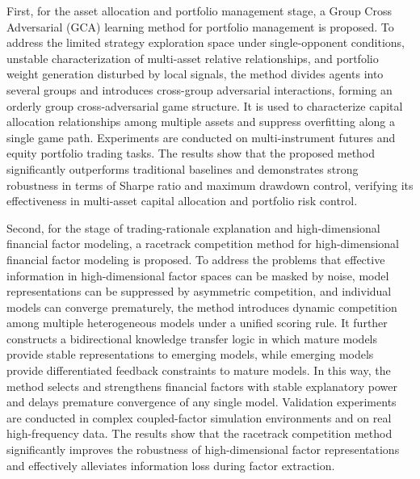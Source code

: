 \begin{eabstract}
First, for the asset allocation and portfolio management stage, a Group Cross Adversarial (GCA) learning method for portfolio management is proposed. To address the limited strategy exploration space under single-opponent conditions, unstable characterization of multi-asset relative relationships, and portfolio weight generation disturbed by local signals, the method divides agents into several groups and introduces cross-group adversarial interactions, forming an orderly group cross-adversarial game structure. It is used to characterize capital allocation relationships among multiple assets and suppress overfitting along a single game path. Experiments are conducted on multi-instrument futures and equity portfolio trading tasks. The results show that the proposed method significantly outperforms traditional baselines and demonstrates strong robustness in terms of Sharpe ratio and maximum drawdown control, verifying its effectiveness in multi-asset capital allocation and portfolio risk control.

Second, for the stage of trading-rationale explanation and high-dimensional financial factor modeling, a racetrack competition method for high-dimensional financial factor modeling is proposed. To address the problems that effective information in high-dimensional factor spaces can be masked by noise, model representations can be suppressed by asymmetric competition, and individual models can converge prematurely, the method introduces dynamic competition among multiple heterogeneous models under a unified scoring rule. It further constructs a bidirectional knowledge transfer logic in which mature models provide stable representations to emerging models, while emerging models provide differentiated feedback constraints to mature models. In this way, the method selects and strengthens financial factors with stable explanatory power and delays premature convergence of any single model. Validation experiments are conducted in complex coupled-factor simulation environments and on real high-frequency data. The results show that the racetrack competition method significantly improves the robustness of high-dimensional factor representations and effectively alleviates information loss during factor extraction.


\end{eabstract}
